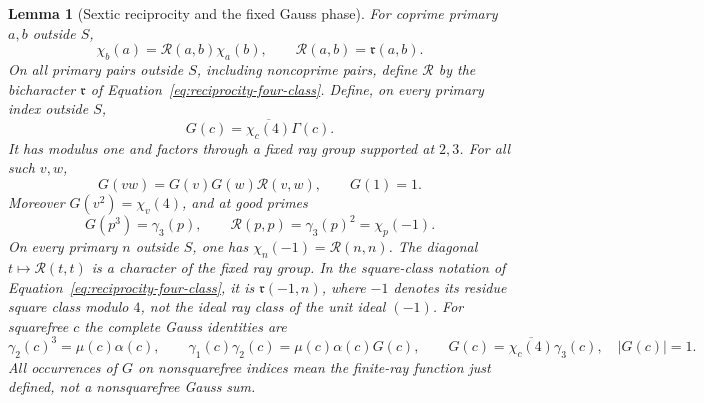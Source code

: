 \documentclass[11pt,a4paper]{article}
\numberwithin{equation}{section}
\numberwithin{figure}{section}
\newtheorem{lemma}[theorem]{Lemma}
\theoremstyle{definition}
\theoremstyle{remark}
\begin{document}
\begin{lemma}[Sextic reciprocity and the fixed Gauss phase]
\label{lem:fixed-gauss-phase}
For coprime primary $a,b$ outside $S$,
\[
 \chi_b(a)=\mathcal R(a,b)\chi_a(b),\qquad
 \mathcal R(a,b)=\mathfrak r(a,b).
\]
On all primary pairs outside $S$, including noncoprime pairs, define
$\mathcal R$ by the bicharacter $\mathfrak r$ of
Equation~\eqref{eq:reciprocity-four-class}.  Define, on every primary index
outside $S$,
\[
 G(c)=\overline{\chi_c(4)}\Gamma(c).
\]
It has modulus one and factors through a fixed ray group supported at $2,3$.
For all such $v,w$,
\begin{equation}\label{eq:G-quadratic-refinement}
 G(vw)=G(v)G(w)\mathcal R(v,w),\qquad G(1)=1.
\end{equation}
Moreover $G(v^2)=\chi_v(4)$, and at good primes
\begin{equation}\label{eq:fixed-gauss-phases}
 G(p^3)=\gamma_3(p),\qquad
 \mathcal R(p,p)=\gamma_3(p)^2=\chi_p(-1).
\end{equation}
On every primary $n$ outside $S$, one has
$\chi_n(-1)=\mathcal R(n,n)$.  The diagonal $t\mapsto\mathcal R(t,t)$ is a
character of the fixed ray group.  In the square-class notation of
Equation~\eqref{eq:reciprocity-four-class}, it is $\mathfrak r(-1,n)$, where
$-1$ denotes its residue square class modulo $4$, not the ideal ray class of
the unit ideal $(-1)$.
For squarefree $c$ the complete Gauss identities are
\begin{equation}\label{eq:signal}
 \gamma_2(c)^3=\mu(c)\alpha(c),\qquad
 \gamma_1(c)\gamma_2(c)=\mu(c)\alpha(c)G(c),\qquad
 G(c)=\overline{\chi_c(4)}\gamma_3(c),\quad |G(c)|=1.
\end{equation}
All occurrences of $G$ on nonsquarefree indices mean the finite-ray function
just defined, not a nonsquarefree Gauss sum.
\end{lemma}
\end{document}
